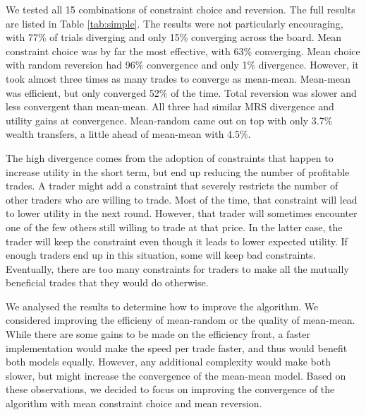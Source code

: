\documentclass[12pt,a4paper,titlepage]{article}
\newcommand{\co}[1]{\textsf{#1}}
\begin{document}
We tested all 15 combinations of constraint choice and reversion.
The full results are listed in Table \ref{tab:simple}.
The results were not particularly encouraging, with 77\% of trials diverging and only 15\% converging across the board.
\co{Mean} constraint choice was by far the most effective, with 63\% converging.
\co{Mean} choice with \co{random} reversion had 96\% convergence and only 1\% divergence.
However, it took almost three times as many trades to converge as \co{mean}-\co{mean}.
\co{Mean}-\co{mean} was efficient, but only converged 52\% of the time.
\co{Total} reversion was slower and less convergent than \co{mean}-\co{mean}.
All three had similar MRS divergence and utility gains at convergence.
\co{Mean}-\co{random} came out on top with only 3.7\% wealth transfers, a little ahead of \co{mean}-\co{mean} with 4.5\%.

The high divergence comes from the adoption of constraints that happen to increase utility in the short term, but end up reducing the number of profitable trades.
A trader might add a constraint that severely restricts the number of other traders who are willing to trade.
Most of the time, that constraint will lead to lower utility in the next round.
However, that trader will sometimes encounter one of the few others still willing to trade at that price.
In the latter case, the trader will keep the constraint even though it leads to lower expected utility.
If enough traders end up in this situation, some will keep bad constraints.
Eventually, there are too many constraints for traders to make all the mutually beneficial trades that they would do otherwise.

We analysed the results to determine how to improve the algorithm.
We considered improving the efficieny of \co{mean}-\co{random} or the quality of \co{mean}-\co{mean}.
While there are some gains to be made on the efficiency front, a faster implementation would make the speed per trade faster, and thus would benefit both models equally.
However, any additional complexity would make both slower, but might increase the convergence of the \co{mean}-\co{mean} model.
Based on these observations, we decided to focus on improving the convergence of the algorithm with \co{mean} constraint choice and \co{mean} reversion.
\end{document}
